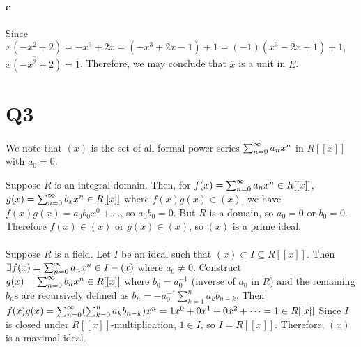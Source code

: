 \documentclass[]{article}
\begin{document}
	\paragraph{c}
	Since $x(-x^2 + 2) = -x^3 + 2x = (-x^3 + 2x - 1) + 1 = (-1)(x^3 - 2x + 1) + 1$, 
	$\overbar{x(-x^2 + 2)} = \overbar{1}$.\newline
	Therefore, we may conclude that $\overbar{x}$ is a unit in $\overbar{E}$.


\section*{Q3}
	\paragraph{}
	We note that $(x)$ is the set of all formal power series $\sum_{n = 0}^{\infty} a_nx^n$ in $R[[x]]$ with $a_0 = 0$.\newline\newline
	
	Suppose $R$ is an integral domain.\newline
	Then, for $f(x) = \sum_{n = 0}^{\infty} a_nx^n \in R[[x]]$, $g(x) = \sum_{n = 0}^{\infty} b_xx^n \in R[[x]]$ where $f(x)g(x) \in (x)$, we have $f(x)g(x) = a_0b_0x^0 + \dots$, so $a_0b_0 = 0$.\newline
	But $R$ is a domain, so $a_0 = 0$ or $b_0 = 0$.\newline
	Therefore $f(x) \in (x)$ or $g(x) \in (x)$, so $(x)$ is a prime ideal.
	
	\paragraph{}
	Suppose $R$ is a field. Let $I$ be an ideal such that $(x) \subset I \subseteq R[[x]]$.\newline
	Then $\exists f(x) = \sum_{n = 0}^{\infty} a_nx^n \in I-(x)$ where $a_0 \not= 0$.\newline
	Construct $g(x) = \sum_{n = 0}^{\infty} b_nx^n \in R[[x]]$ where $b_0 = a_0^{-1}$ (inverse of $a_0$ in $R$) and the remaining $b_n$s are recursively defined as $b_n = -a_0^{-1} \sum_{k=1}^{n} a_kb_{n-k}$.\newline
	Then $f(x)g(x) = \sum_{n = 0}^{\infty} (\sum_{k=0}^{n} a_kb_{n-k})x^n = 1x^0 + 0x^1 + 0x^2 + \dots = 1 \in R[[x]]$\newline
	Since $I$ is closed under $R[[x]]$-multiplication, $1 \in I$, so $I = R[[x]]$.\newline
	Therefore, $(x)$ is a maximal ideal.\newline
	
\end{document}
